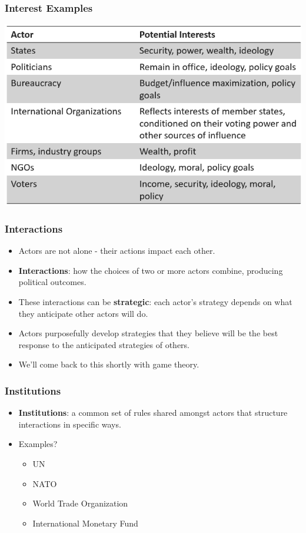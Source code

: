 \documentclass{beamer}
\begin{document}
\begin{frame} 
	\frametitle{\LARGE{Interest Examples}}
	\centering
	\includegraphics[width=\textwidth,height=0.8\textheight,keepaspectratio]{interests.png}
\end{frame}

\begin{frame} 
	\frametitle{\LARGE{Interactions}}
	\begin{itemize}
		\item Actors are not alone - their actions impact each other.
		\item \textbf{Interactions}: how the choices of two or more actors combine, producing political outcomes. \pause
		\item These interactions can be \textbf{strategic}: each actor's strategy depends on what they anticipate other actors will do. \pause
		\item Actors purposefully develop strategies that they believe will be the best response to the anticipated strategies of others. 
		\item We'll come back to this shortly with game theory.
	\end{itemize}
\end{frame}

\begin{frame} 
	\frametitle{\LARGE{Institutions}}
	\begin{itemize}
		\item \textbf{Institutions}: a common set of rules shared amongst actors that structure interactions in specific ways. \pause
		\item Examples? \pause
		\begin{itemize}
			\item UN
			\item NATO
			\item World Trade Organization
			\item International Monetary Fund
		\end{itemize}
	\end{itemize}
\end{frame}
	
\end{document}

